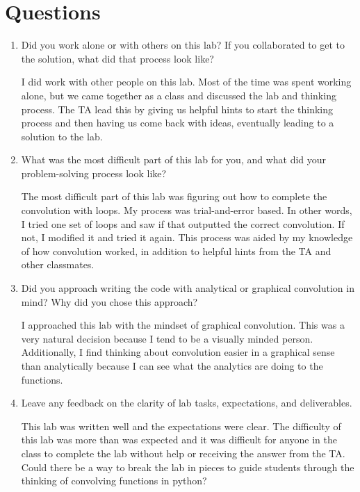 \documentclass[12pt, titlepage]{article}
\begin{document}
        \section{Questions}
        \begin{enumerate}
            \item Did you work alone or with others on this lab?  If you collaborated to get to the solution, what did that process look like?
            
            I did work with other people on this lab.  Most of the time was spent working alone, but we came together as a class and discussed the lab and thinking process.  The TA lead this by giving us helpful hints to start the thinking process and then having us come back with ideas, eventually leading to a solution to the lab.
            
            \item What was the most difficult part of this lab for you, and what did your problem-solving process look like?
            
            The most difficult part of this lab was figuring out how to complete the convolution with loops.  My process was trial-and-error based.  In other words, I tried one set of loops and saw if that outputted the correct convolution.  If not, I modified it and tried it again.  This process was aided by my knowledge of how convolution worked, in addition to helpful hints from the TA and other classmates.
            
            \item Did you approach writing the code with analytical or graphical convolution in mind?  Why did you chose this approach?
            
            I approached this lab with the mindset of graphical convolution.  This was a very natural decision because I tend to be a visually minded person.  Additionally, I find thinking about convolution easier in a graphical sense than analytically because I can see what the analytics are doing to the functions.
            
            \item  Leave any feedback on the clarity of lab tasks, expectations, and deliverables.
            
            This lab was written well and the expectations were clear.  The difficulty of this lab was more than was expected and it was difficult for anyone in the class to complete the lab without help or receiving the answer from the TA.  Could there be a way to break the lab in pieces to guide students through the thinking of convolving functions in python?
        \end{enumerate}
        
\end{document}

